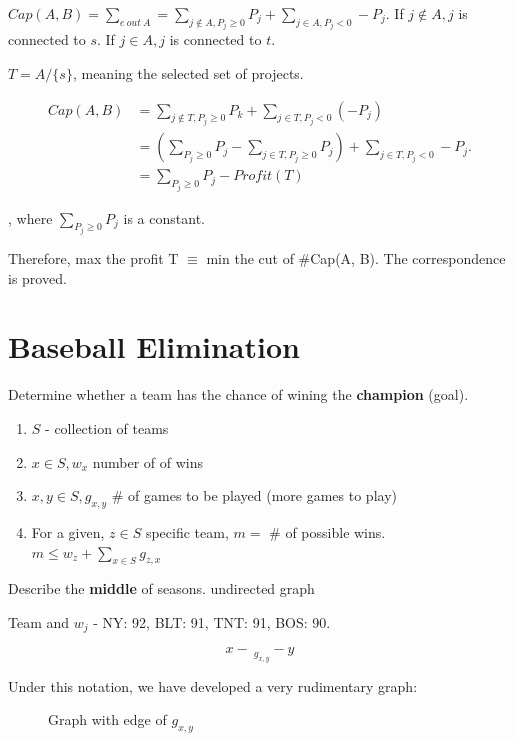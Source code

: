 \documentclass[a4paper]{report}
\theoremstyle{definition}
\begin{document}
$Cap(A, B)=\sum_{e~out~A} = \sum_{j \notin A, P_j\geq 0}P_j+\sum_{j \in A, P_j<0}-P_j$. If $j \notin A, j$ is connected to $s$. If $j \in A, j$ is connected to $t$.

$T=A/\{s\}$, meaning the selected set of projects. 

\begin{align*}
Cap(A, B)&=\sum_{j\notin T, P_j\geq 0}P_k+\sum_{j\in T, P_j <0}(-P_j) \\
&= (\sum_{P_j\geq 0}P_j-\sum_{j \in T, P_j\geq 0}P_j)+\sum_{j\in T, P_j <0}-P_j.\\
&=  \sum_{P_j\geq 0}P_j - Profit(T)
\end{align*}

, where $\sum_{P_j\geq 0}P_j$ is a constant.

Therefore, max the profit T $\equiv$ min the cut of #Cap(A, B). The correspondence is proved.


\section{Baseball Elimination}
Determine whether a team has the chance of wining the \textbf{champion} (goal).
\begin{enumerate}
\item $S$ - collection of teams
\item $x\in S, w_x$ number of of wins
\item $x, y \in S, g_{x, y}$  \# of games to be played (more games to play)
\item For a given, $z\in S$ specific team, $m=$ \# of possible wins. $m \leq w_z+\sum_{x\in S} g_{z,x}$
\end{enumerate}

Describe the \textbf{middle} of seasons. undirected graph

Team and $w_j$ - NY: 92, BLT: 91, TNT: 91, BOS: 90.

$$x -\ _{g_{x, y}} - y$$


Under this notation, we have developed a very rudimentary graph:
\begin{figure}[!htp]
\centering
{}
\caption{Graph with edge of $g_{x,y}$}
\label{fig:baseball0}
\end{figure}
\end{document}
